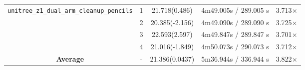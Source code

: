 \begin{table}[htbp]
\begin{tabular}{|c|c|c|c|c|}
        \multirow{4}{*}{\texttt{unitree\_z1\_dual\_arm\_cleanup\_pencils}} 
        & 1 & 21.718(0.486) & 4m49.005s / 289.005 s & 3.713$\times$ \\ \cline{2-5}
        & 2 & 20.385(-2.156)& 4m49.090s / 289.090 s & 3.725$\times$ \\ \cline{2-5}
        & 3 & 22.593(2.597) & 4m49.847s / 289.847 s & 3.701$\times$ \\ \cline{2-5}
        & 4 & 21.016(-1.849)& 4m50.073s / 290.073 s & 3.712$\times$ \\ \hline
        
        \textbf{Average} & - & 21.386(0.0437) & 5m36.944s / 336.944 s & 3.822$\times$ \\ \hline
    \end{tabular}
\end{table}


        
        
        
        

